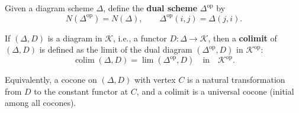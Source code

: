 Given a diagram scheme $\Delta$, define the \textbf{dual scheme} $\Delta^{\text{op}}$ by
$$N(\Delta^{\text{op}}) = N(\Delta), \qquad \Delta^{\text{op}}(i, j) = \Delta(j, i).$$

If $(\Delta, D)$ is a diagram in $\mathcal{K}$, i.e., a functor $D: \Delta \to \mathcal{K}$, then a \textbf{colimit} of $(\Delta, D)$ is defined as the limit of the dual diagram $(\Delta^{\text{op}}, D)$ in $\mathcal{K}^{\text{op}}$:
$$\operatorname{colim}(\Delta, D) = \lim(\Delta^{\text{op}}, D) \quad\text{in}\quad \mathcal{K}^{\text{op}}.$$

Equivalently, a cocone on $(\Delta, D)$ with vertex $C$ is a natural transformation from $D$ to the constant functor at $C$, and a colimit is a universal cocone (initial among all cocones).
